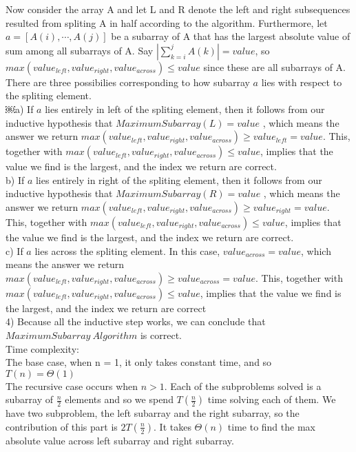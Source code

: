 \documentclass[12pt,letterpaper]{article}
\begin{document}
\begin{enumerate}
Now consider the array A and let L and R denote the left and right subsequences resulted from spliting A in half according to the algorithm. Furthermore, let $ a = [A(i),\cdots,A(j)] $ be a subarray of A that has the largest absolute value of sum among all subarrays of A. Say $ |\sum\limits_{k=i}^{j}A(k)| = value$, so $ max (value_{left},value_{right},value_{across}) \le value $ since these are all subarrays of A. \\
There are three possibilies corresponding to how subarray $ a $ lies with respect to the spliting element. \\
￼a) If $ a $ lies entirely in left of the spliting element, then it follows from our inductive hypothesis that $ Maximum Subarray(L) = value $ , which means the answer we return $ max ( value_{left},value_{right},value_{across} ) \ge value_{left} = value $. This, together with $ max (value_{left},value_{right},value_{across}) \le value $, implies that the value we find is the largest, and the index we return are correct. \\
b) If $ a $ lies entirely in right of the spliting element, then it follows from our inductive hypothesis that $ Maximum Subarray(R) = value $ , which means the answer we return $ max ( value_{left},value_{right},value_{across} ) \ge value_{right} = value $. This, together with $ max (value_{left},value_{right},value_{across}) \le value $, implies that the value we find is the largest, and the index we return are correct. \\
c) If $ a $ lies across the spliting element. In this case, $value_{across} = value $,  which means the answer we return $ max ( value_{left},value_{right},value_{across} ) \ge value_{across} = value $. This, together with $ max (value_{left},value_{right},value_{across}) \le value $, implies that the value we find is the largest, and the index we return are correct \\
4) Because all the inductive step works, we can conclude that $Maximum Subarray \ Algorithm$ is correct. \\
Time complexity: \\
The base case, when n = 1, it only takes constant time, and so \\
$ T(n) = \Theta(1) $ \\
The recursive case occurs when $ n > 1 $. Each of the subproblems solved is a subarray of $ \frac{n}{2} $ elements and so we spend $ T(\frac{n}{2}) $ time solving each of them. We have two subproblem, the left subarray and the right subarray, so the contribution of this part is $ 2 T(\frac{n}{2}) $. It takes $ \Theta(n) $ time to find the max absolute value across left subarray and right subarray. \\

\end{enumerate}
\end{document}
